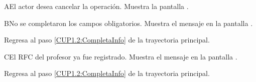 \begin{UCtrayectoriaA}{A}{El actor desea cancelar la operación.}
	\UCpaso [\UCsist] Muestra la pantalla . 
\end{UCtrayectoriaA}

\begin{UCtrayectoriaA}{B}{No se completaron los campos obligatorios.}
	\UCpaso [\UCsist] Muestra el mensaje  en la pantalla .
	
	\UCpaso Regresa al paso \ref{CUP1.2:CompletaInfo} de la trayectoria principal.
\end{UCtrayectoriaA}

\begin{UCtrayectoriaA}{C}{El RFC del profesor ya fue registrado.}
	\UCpaso [\UCsist] Muestra el mensaje  en la pantalla .
	
	\UCpaso Regresa al paso \ref{CUP1.2:CompletaInfo} de la trayectoria principal.
\end{UCtrayectoriaA}